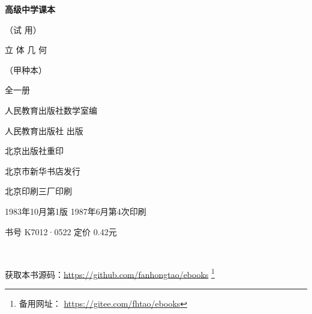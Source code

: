 \begin{titlepage}
    \begin{center}
        \vspace*{3cm}

        {\Large \textbf{高级中学课本} }

        {\Large（试 用）}

        \vspace{1cm}

        {\Huge 立 \quad 体 \quad 几 \quad 何}

        \vspace{0.5cm}

        {\Large （甲种本）}

        {\Large 全一册}

        \vspace{1cm}
        {\Large 人民教育出版社数学室编}

        \vfill


        人民教育出版社 出版

        北京出版社重印

        北京市新华书店发行

        北京印刷三厂印刷

        1983年10月第1版  \qquad 1987年6月第4次印刷

        书号 K7012·0522 \quad 定价 0.42元

        \,

        获取本书源码：\url{https://github.com/fanhongtao/ebooks} \footnote{备用网址： \url{https://gitee.com/fhtao/ebooks} }
    \end{center}
 \end{titlepage}
